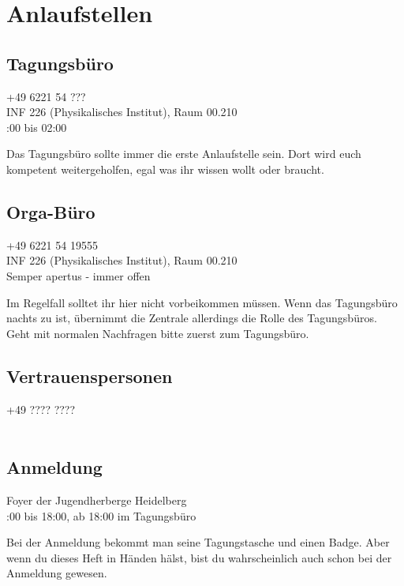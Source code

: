 
\section{Anlaufstellen}

\subsection{Tagungsbüro}
\faPhone \quad +49 6221 54 ???\\ 
\faMapPin \quad INF 226 (Physikalisches Institut), Raum 00.210\\ %
\faClockO {}:00 bis 02:00 %

\noindent Das Tagungsbüro sollte immer die erste Anlaufstelle sein. Dort wird euch kompetent weitergeholfen, egal was ihr wissen wollt oder braucht.

\subsection{Orga-Büro}
\faPhone \quad +49 6221 54 19555\\
\faMapPin \quad INF 226 (Physikalisches Institut), Raum 00.210\\
\faClockO \quad Semper apertus - immer offen

\noindent Im Regelfall solltet ihr hier nicht vorbeikommen müssen. Wenn das Tagungsbüro nachts zu ist, übernimmt die Zentrale allerdings die Rolle des Tagungsbüros. Geht mit normalen Nachfragen bitte zuerst zum Tagungsbüro. %

\subsection{Vertrauenspersonen}
\faPhone \quad +49 ???? ????\\  %
\faUsers \quad \\ 

\noindent {}

\subsection{Anmeldung}
\faMapPin \quad Foyer der Jugendherberge Heidelberg\\ %
\faClockO {}:00 bis 18:00, ab 18:00 im Tagungsbüro %

\noindent Bei der Anmeldung bekommt man seine Tagungstasche und einen Badge. Aber wenn du dieses Heft in Händen hälst, bist du wahrscheinlich auch schon bei der Anmeldung gewesen. %

